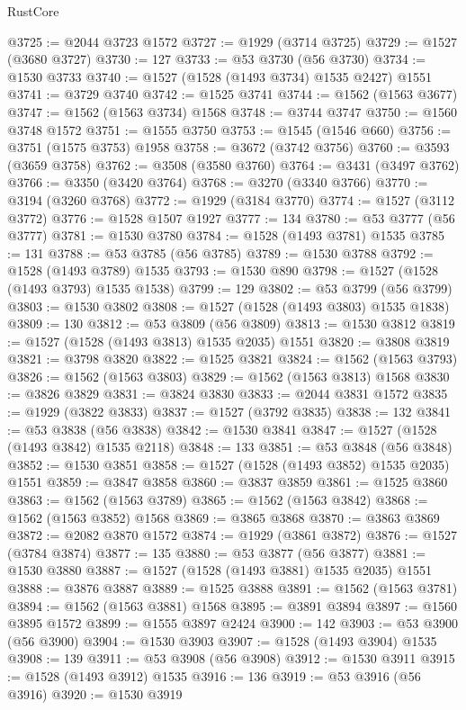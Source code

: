 \begin{lexlean}{RustCore}
\begin{coremodule}
@3725 := @2044 @3723 @1572
@3727 := @1929 (@3714 @3725)
@3729 := @1527 (@3680 @3727)
@3730 := 127
@3733 := @53 @3730 (@56 @3730)
@3734 := @1530 @3733
@3740 := @1527 (@1528 (@1493 @3734) @1535 @2427) @1551
@3741 := @3729 @3740
@3742 := @1525 @3741
@3744 := @1562 (@1563 @3677)
@3747 := @1562 (@1563 @3734) @1568
@3748 := @3744 @3747
@3750 := @1560 @3748 @1572
@3751 := @1555 @3750
@3753 := @1545 (@1546 @660)
@3756 := @3751 (@1575 @3753) @1958
@3758 := @3672 (@3742 @3756)
@3760 := @3593 (@3659 @3758)
@3762 := @3508 (@3580 @3760)
@3764 := @3431 (@3497 @3762)
@3766 := @3350 (@3420 @3764)
@3768 := @3270 (@3340 @3766)
@3770 := @3194 (@3260 @3768)
@3772 := @1929 (@3184 @3770)
@3774 := @1527 (@3112 @3772)
@3776 := @1528 @1507 @1927
@3777 := 134
@3780 := @53 @3777 (@56 @3777)
@3781 := @1530 @3780
@3784 := @1528 (@1493 @3781) @1535
@3785 := 131
@3788 := @53 @3785 (@56 @3785)
@3789 := @1530 @3788
@3792 := @1528 (@1493 @3789) @1535
@3793 := @1530 @890
@3798 := @1527 (@1528 (@1493 @3793) @1535 @1538)
@3799 := 129
@3802 := @53 @3799 (@56 @3799)
@3803 := @1530 @3802
@3808 := @1527 (@1528 (@1493 @3803) @1535 @1838)
@3809 := 130
@3812 := @53 @3809 (@56 @3809)
@3813 := @1530 @3812
@3819 := @1527 (@1528 (@1493 @3813) @1535 @2035) @1551
@3820 := @3808 @3819
@3821 := @3798 @3820
@3822 := @1525 @3821
@3824 := @1562 (@1563 @3793)
@3826 := @1562 (@1563 @3803)
@3829 := @1562 (@1563 @3813) @1568
@3830 := @3826 @3829
@3831 := @3824 @3830
@3833 := @2044 @3831 @1572
@3835 := @1929 (@3822 @3833)
@3837 := @1527 (@3792 @3835)
@3838 := 132
@3841 := @53 @3838 (@56 @3838)
@3842 := @1530 @3841
@3847 := @1527 (@1528 (@1493 @3842) @1535 @2118)
@3848 := 133
@3851 := @53 @3848 (@56 @3848)
@3852 := @1530 @3851
@3858 := @1527 (@1528 (@1493 @3852) @1535 @2035) @1551
@3859 := @3847 @3858
@3860 := @3837 @3859
@3861 := @1525 @3860
@3863 := @1562 (@1563 @3789)
@3865 := @1562 (@1563 @3842)
@3868 := @1562 (@1563 @3852) @1568
@3869 := @3865 @3868
@3870 := @3863 @3869
@3872 := @2082 @3870 @1572
@3874 := @1929 (@3861 @3872)
@3876 := @1527 (@3784 @3874)
@3877 := 135
@3880 := @53 @3877 (@56 @3877)
@3881 := @1530 @3880
@3887 := @1527 (@1528 (@1493 @3881) @1535 @2035) @1551
@3888 := @3876 @3887
@3889 := @1525 @3888
@3891 := @1562 (@1563 @3781)
@3894 := @1562 (@1563 @3881) @1568
@3895 := @3891 @3894
@3897 := @1560 @3895 @1572
@3899 := @1555 @3897 @2424
@3900 := 142
@3903 := @53 @3900 (@56 @3900)
@3904 := @1530 @3903
@3907 := @1528 (@1493 @3904) @1535
@3908 := 139
@3911 := @53 @3908 (@56 @3908)
@3912 := @1530 @3911
@3915 := @1528 (@1493 @3912) @1535
@3916 := 136
@3919 := @53 @3916 (@56 @3916)
@3920 := @1530 @3919

\end{coremodule}
\end{lexlean}
